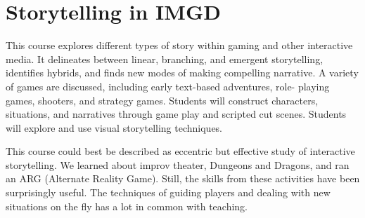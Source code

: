 \section{Storytelling in IMGD}

\begin{meta}
\end{meta}

\coursedesc
This course explores different types of story within gaming and other
interactive media. It delineates between linear, branching, and emergent
storytelling, identifies hybrids, and finds new modes of making
compelling narrative. A variety of games are discussed, including early
text-based adventures, role- playing games, shooters, and strategy
games. Students will construct characters, situations, and narratives
through game play and scripted cut scenes. Students will explore and use
visual storytelling techniques.

\courseself
This course could best be described as eccentric but effective study
of interactive storytelling. We learned about improv theater, Dungeons
and Dragons, and ran an ARG (Alternate Reality Game). Still, the skills
from these activities have been surprisingly useful. The techniques of
guiding players and dealing with new situations on the fly has a lot in
common with teaching.


